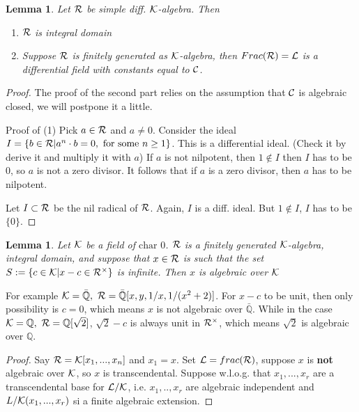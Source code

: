 \documentclass[11pt]{article}
\newtheorem{lemma}[thm]{Lemma}
\newcommand{\ratl}{\mathbb Q}
\newcommand{\calc}{{\cal C}}
\newcommand{\calk}{{\cal K}}
\newcommand{\call}{{\cal L}}
\newcommand{\calr}{{\cal R}}
\begin{document}
\begin{lemma}
Let $\calr$ be simple diff. $\calk$-algebra. Then 
\begin{enumerate}
\item $\calr$  is integral domain
\item Suppose $\calr$ is finitely generated as $\calk$-algebra, then $Frac(\calr)=\call$ is a differential field with constants equal to $\calc$. 
\end{enumerate}
\end{lemma}
\begin{proof}
The proof of the second part relies on the assumption that $\calc$ is algebraic closed, we will postpone it a little.

Proof of (1) Pick $a\in \calr$ and $a\neq0$. Consider the ideal $I=\{b\in \calr|a^n\cdot b=0, \text{ for some $n\geq1$}\}$. This is a differential ideal. (Check it by derive it and multiply it with $a$)
If $a$ is not nilpotent, then $1\not\in I$ then $I$ has to be $0$, so $a$ is not a zero divisor.
It follows that if $a$ is a zero divisor, then $a$ has to be nilpotent.

Let $I\subset \calr$ be the nil radical of $\calr$. Again, $I$ is a diff. ideal. But $1\not \in I$, $I$ has to be $\{0\}$.
\end{proof}

\begin{lemma}
Let $\calk$ be a field of $\text{char } 0$. $\calr$ is a finitely generated $\calk$-algebra, integral domain, and suppose that $x\in \calr$ is such that the set $S:=\{c\in \calk|x-c\in \calr^{\times}\}$ is infinite. Then $x$ is algebraic over $\calk$
\end{lemma}
For example $\calk=\bar{\ratl}, \ \calr=\bar{\ratl}[x,y,1/x,1/(x^2+2)]$. For $x-c$ to be unit, then only possibility is  $c=0$, which means $x$ is not algebraic over $\bar{\ratl}$. While in the case
$\calk=\ratl, \ \calr=\ratl[\sqrt{2}]$, $\sqrt{2}-c$ is always unit in $\calr^\times$, which means $\sqrt{2}$ is algebraic over $\ratl$.
\begin{proof}
Say $\calr=\calk[x_1,...,x_n]$ and $x_1=x$. Set $\call=frac(\calr)$, suppose $x$ is \textbf{not} algebraic over $\calk$, so $x$ is transcendental. Suppose w.l.o.g. that
$x_1,...,x_r$ are a transcendental base for $\call/\calk$, i.e. $x_1,..,x_r$ are algebraic independent and $L/\calk(x_1,...,x_r)$ si a finite algebraic extension.
\end{proof}
\end{document}
